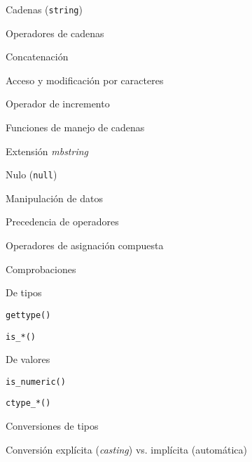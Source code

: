 \begin{longenum}
\begin{longenum}
\begin{longenum}
\begin{longenum}
            \end{longenum}
            \item Cadenas (\texttt{string})
            \begin{longenum}
                \item Operadores de cadenas
                \begin{longenum}
                    \item Concatenación
                    \item Acceso y modificación por caracteres
                    \item Operador de incremento \opcional\
                \end{longenum}
                \item Funciones de manejo de cadenas
                \item Extensión \textit{mbstring}
            \end{longenum}
            \item Nulo (\texttt{null})
        \end{longenum}
        \item Manipulación de datos
        \begin{longenum}
            \item Precedencia de operadores
            \item Operadores de asignación compuesta
            \item Comprobaciones
            \begin{longenum}
                \item De tipos
                \begin{longenum}
                    \item \texttt{gettype()}
                    \item \texttt{is\_*()}
                \end{longenum}
                \item De valores
                \begin{longenum}
                    \item \texttt{is\_numeric()}
                    \item \texttt{ctype\_*()}
                \end{longenum}
            \end{longenum}
            \item Conversiones de tipos
            \begin{longenum}
                \item Conversión explícita (\textit{casting}) vs. implícita (automática)

\end{longenum}
\end{longenum}
\end{longenum}
\end{longenum}
